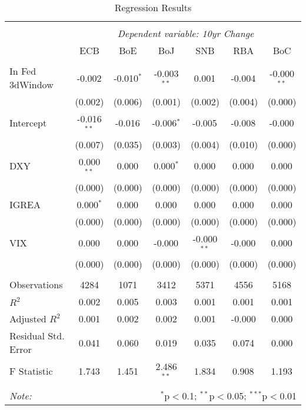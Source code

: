 \begin{table}[!htbp] \centering
  \caption{Regression Results}
\begin{tabular}{@{\extracolsep{5pt}}lcccccc}
\\[-1.8ex]\hline
\hline \\[-1.8ex]
& \multicolumn{6}{c}{\textit{Dependent variable: 10yr Change}} \
\cr \cline{2-7}
\\[-1.8ex] & \multicolumn{1}{c}{ECB} & \multicolumn{1}{c}{BoE} & \multicolumn{1}{c}{BoJ} & \multicolumn{1}{c}{SNB} & \multicolumn{1}{c}{RBA} & \multicolumn{1}{c}{BoC}  \\
\hline \\[-1.8ex]
 In Fed 3dWindow & -0.002$^{}$ & -0.010$^{*}$ & -0.003$^{**}$ & 0.001$^{}$ & -0.004$^{}$ & -0.000$^{**}$ \\
& (0.002) & (0.006) & (0.001) & (0.002) & (0.004) & (0.000) \\
 Intercept & -0.016$^{**}$ & -0.016$^{}$ & -0.006$^{*}$ & -0.005$^{}$ & -0.008$^{}$ & -0.000$^{}$ \\
& (0.007) & (0.035) & (0.003) & (0.004) & (0.010) & (0.000) \\
 DXY & 0.000$^{**}$ & 0.000$^{}$ & 0.000$^{*}$ & 0.000$^{}$ & 0.000$^{}$ & 0.000$^{}$ \\
& (0.000) & (0.000) & (0.000) & (0.000) & (0.000) & (0.000) \\
 IGREA & 0.000$^{*}$ & 0.000$^{}$ & 0.000$^{}$ & 0.000$^{}$ & 0.000$^{}$ & 0.000$^{}$ \\
& (0.000) & (0.000) & (0.000) & (0.000) & (0.000) & (0.000) \\
 VIX & 0.000$^{}$ & 0.000$^{}$ & -0.000$^{}$ & -0.000$^{**}$ & -0.000$^{}$ & 0.000$^{}$ \\
& (0.000) & (0.000) & (0.000) & (0.000) & (0.000) & (0.000) \\
\hline \\[-1.8ex]
 Observations & 4284 & 1071 & 3412 & 5371 & 4556 & 5168 \\
 $R^2$ & 0.002 & 0.005 & 0.003 & 0.001 & 0.001 & 0.001 \\
 Adjusted $R^2$ & 0.001 & 0.002 & 0.002 & 0.001 & -0.000 & 0.000 \\
 Residual Std. Error & 0.041 & 0.060 & 0.019 & 0.035 & 0.074 & 0.000 \\
 F Statistic & 1.743$^{}$ & 1.451$^{}$ & 2.486$^{**}$ & 1.834$^{}$ & 0.908$^{}$ & 1.193$^{}$ \\
\hline
\hline \\[-1.8ex]
\textit{Note:} & \multicolumn{6}{r}{$^{*}$p$<$0.1; $^{**}$p$<$0.05; $^{***}$p$<$0.01} \\
\end{tabular}
\end{table}
